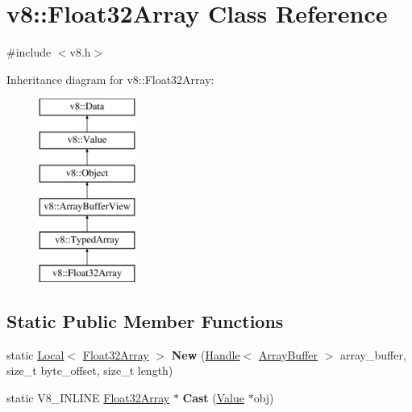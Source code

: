 \hypertarget{classv8_1_1_float32_array}{}\section{v8\+:\+:Float32\+Array Class Reference}
\label{classv8_1_1_float32_array}


{\ttfamily \#include $<$v8.\+h$>$}

Inheritance diagram for v8\+:\+:Float32\+Array\+:\begin{figure}[H]
\begin{center}
\leavevmode
\includegraphics[height=6.000000cm]{classv8_1_1_float32_array}
\end{center}
\end{figure}
\subsection*{Static Public Member Functions}
\begin{DoxyCompactItemize}
\item 
\hypertarget{classv8_1_1_float32_array_a6fea1d1987ec9abce97060900d5fc4af}{}static \hyperlink{classv8_1_1_local}{Local}$<$ \hyperlink{classv8_1_1_float32_array}{Float32\+Array} $>$ {\bfseries New} (\hyperlink{classv8_1_1_local}{Handle}$<$ \hyperlink{classv8_1_1_array_buffer}{Array\+Buffer} $>$ array\+\_\+buffer, size\+\_\+t byte\+\_\+offset, size\+\_\+t length)\label{classv8_1_1_float32_array_a6fea1d1987ec9abce97060900d5fc4af}

\item 
\hypertarget{classv8_1_1_float32_array_adf926d03cacd4b3901d7f9750671a350}{}static V8\+\_\+\+I\+N\+L\+I\+N\+E \hyperlink{classv8_1_1_float32_array}{Float32\+Array} $\ast$ {\bfseries Cast} (\hyperlink{classv8_1_1_value}{Value} $\ast$obj)\label{classv8_1_1_float32_array_adf926d03cacd4b3901d7f9750671a350}

\end{DoxyCompactItemize}

